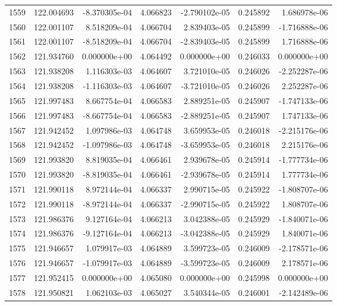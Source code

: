 \begin{tabular}{rrrrrrr}
1559 & 122.004693 & -8.370305e-04 &  4.066823 & -2.790102e-05 &    0.245892 &  1.686978e-06 \\
1560 & 122.001107 &  8.518209e-04 &  4.066704 &  2.839403e-05 &    0.245899 & -1.716888e-06 \\
1561 & 122.001107 & -8.518209e-04 &  4.066704 & -2.839403e-05 &    0.245899 &  1.716888e-06 \\
1562 & 121.934760 &  0.000000e+00 &  4.064492 &  0.000000e+00 &    0.246033 &  0.000000e+00 \\
1563 & 121.938208 &  1.116303e-03 &  4.064607 &  3.721010e-05 &    0.246026 & -2.252287e-06 \\
1564 & 121.938208 & -1.116303e-03 &  4.064607 & -3.721010e-05 &    0.246026 &  2.252287e-06 \\
1565 & 121.997483 &  8.667754e-04 &  4.066583 &  2.889251e-05 &    0.245907 & -1.747133e-06 \\
1566 & 121.997483 & -8.667754e-04 &  4.066583 & -2.889251e-05 &    0.245907 &  1.747133e-06 \\
1567 & 121.942452 &  1.097986e-03 &  4.064748 &  3.659953e-05 &    0.246018 & -2.215176e-06 \\
1568 & 121.942452 & -1.097986e-03 &  4.064748 & -3.659953e-05 &    0.246018 &  2.215176e-06 \\
1569 & 121.993820 &  8.819035e-04 &  4.066461 &  2.939678e-05 &    0.245914 & -1.777734e-06 \\
1570 & 121.993820 & -8.819035e-04 &  4.066461 & -2.939678e-05 &    0.245914 &  1.777734e-06 \\
1571 & 121.990118 &  8.972144e-04 &  4.066337 &  2.990715e-05 &    0.245922 & -1.808707e-06 \\
1572 & 121.990118 & -8.972144e-04 &  4.066337 & -2.990715e-05 &    0.245922 &  1.808707e-06 \\
1573 & 121.986376 &  9.127164e-04 &  4.066213 &  3.042388e-05 &    0.245929 & -1.840071e-06 \\
1574 & 121.986376 & -9.127164e-04 &  4.066213 & -3.042388e-05 &    0.245929 &  1.840071e-06 \\
1575 & 121.946657 &  1.079917e-03 &  4.064889 &  3.599723e-05 &    0.246009 & -2.178571e-06 \\
1576 & 121.946657 & -1.079917e-03 &  4.064889 & -3.599723e-05 &    0.246009 &  2.178571e-06 \\
1577 & 121.952415 &  0.000000e+00 &  4.065080 &  0.000000e+00 &    0.245998 &  0.000000e+00 \\
1578 & 121.950821 &  1.062103e-03 &  4.065027 &  3.540344e-05 &    0.246001 & -2.142489e-06 \\

\end{tabular}
